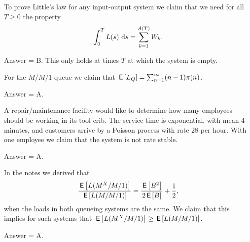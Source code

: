 \begin{exercise}[201807]
To prove Little's law for any input-output system we claim that we need for all $T\geq 0$ the property 
\begin{equation*}
  \int_0^T L(s)\, \,\text{d}s  =  \sum_{k=1}^{A(T)} W_k.
\end{equation*}
\begin{solution}
Answer = B. This only holds at times $T$ at which the system is empty.
\end{solution}
\end{exercise}

\begin{exercise}[201807]
For the $M/M/1$ queue we claim  that $\,\mathsf{E}\left[L_Q\right] = \sum_{n=1}^\infty (n-1)\pi(n)$.
\begin{solution}
Answer = A.
\end{solution}
\end{exercise}

\begin{exercise}[201807]
 A repair/maintenance facility would like to determine
  how many employees should be working in its tool crib. The service
  time is exponential, with mean 4 minutes, and customers arrive by a
  Poisson process with rate 28 per hour. With one employee we claim that the system is not rate stable.
\begin{solution}
Answer = A.
\end{solution}
\end{exercise}

\begin{exercise}[201807]
  In the notes we derived that
    \begin{equation*}
    \frac{\,\mathsf{E}\left[L(M^X/M/1)\right]}{\,\mathsf{E}\left[L(M/M/1)\right]} = \frac{\,\mathsf{E}\left[B^2\right]}{2\,\mathsf{E}\left[B\right]} + \frac 12,
    \end{equation*}
when the loads in both queueing systems are the same. We claim that this implies for such systems that
$\,\mathsf{E}\left[L(M^X/M/1)\right]\geq \,\mathsf{E}\left[L(M/M/1)\right]$.
\begin{solution}
Answer = A.
\end{solution}
\end{exercise}


